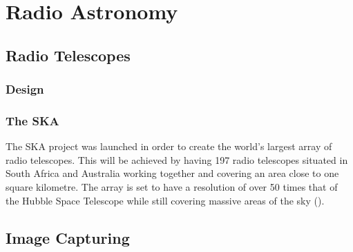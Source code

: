 \section{Radio Astronomy}\label{ra}
\subsection{Radio Telescopes}\label{ra:sec:rt}
%
\subsubsection{Design}\label{ra:ssec:des}
%
\subsubsection{The SKA}
The SKA project was launched in order to create the world's largest array of radio telescopes. This will be achieved by having 197 radio telescopes situated in South Africa and Australia working together and covering an area close to one square kilometre. The array is set to have a resolution of over 50 times that of the Hubble Space Telescope while still covering massive areas of the sky (\cite{SKAsite}).
\subsection{Image Capturing}\label{ra:sec:ic}
%
